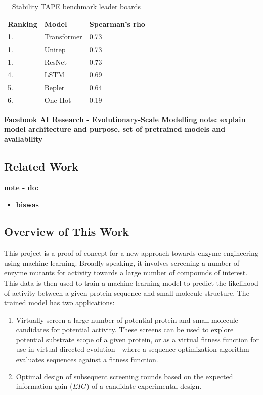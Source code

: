 \documentclass[16pt]{book}
\begin{document}
\begin{table}
	\begin{center}
		\caption{\label{tapestab} Stability TAPE benchmark leader boards }
		\begin{tabular}{l|p{3cm}|l}
			\textbf{Ranking} & \textbf{Model} & \textbf{Spearman's rho}\\
		\hline 
			 1. & Transformer & 0.73 \\
			 1. & Unirep & 0.73 \\
			 1. & ResNet & 0.73 \\
			 4. & LSTM & 0.69 \\
			 5. & Bepler & 0.64 \\
			 6. & One Hot & 0.19 \\
		\end{tabular}
	\end{center}
\end{table}

\textbf{Facebook AI Research - Evolutionary-Scale Modelling}
\textbf{note: explain model architecture and purpose, set of pretrained models and availability}

\subsection{Related Work}

\textbf{note - do:}
\begin{itemize}
	\item \textbf{biswas}
\end{itemize}

\subsection{Overview of This Work}

This project is a proof of concept for a new approach towards enzyme engineering using machine learning.
Broadly speaking, it involves screening a number of enzyme mutants for activity towards a large number of compounds of interest.
This data is then used to train a machine learning model to predict the likelihood of activity between a given protein sequence and small molecule structure.
The trained model has two applications:
\begin{enumerate}
	\item Virtually screen a large number of potential protein and small molecule candidates for potential activity. 
		These screens can be used to explore potential substrate scope of a given protein, or as a virtual fitness function for use in virtual directed evolution - where a sequence optimization algorithm evaluates sequences against a fitness function.
	\item Optimal design of subsequent screening rounds based on the expected information gain ($EIG$) of a candidate experimental design.
\end{enumerate}
\end{document}

